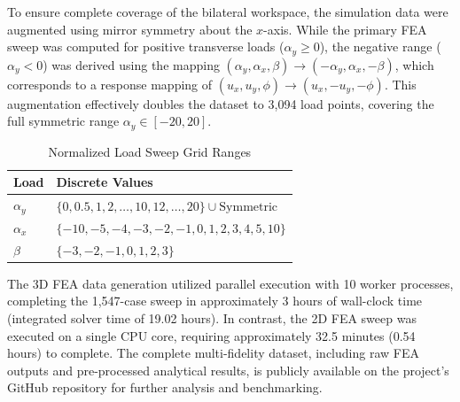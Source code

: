 \documentclass[colorlinks,upint,subscriptcorrection,varvw,hyphenate,balance]{asmeconf} %
\begin{document}
To ensure complete coverage of the bilateral workspace, the simulation data were augmented using mirror symmetry about the $x$-axis. While the primary FEA sweep was computed for positive transverse loads ($\alpha_y \geq 0$), the negative range ($\alpha_y < 0$) was derived using the mapping $(\alpha_y, \alpha_x, \beta) \to (-\alpha_y, \alpha_x, -\beta)$, which corresponds to a response mapping of $(u_x, u_y, \phi) \to (u_x, -u_y, -\phi)$. This augmentation effectively doubles the dataset to 3,094 load points, covering the full symmetric range $\alpha_y \in [-20, 20]$.

\begin{table}[ht]
\centering
\caption{Normalized Load Sweep Grid Ranges}
\label{tab:load_sweep}
\begin{tabular}{ll}
\toprule
\textbf{Load } & \textbf{Discrete Values} \\
\midrule
$\alpha_y$ & $\{0, 0.5, 1, 2, \dots, 10, 12, \dots, 20\} \cup \text{Symmetric}$ \\
$\alpha_x$ & $\{-10, -5, -4, -3, -2, -1, 0, 1, 2, 3, 4, 5, 10\}$ \\
$\beta$ & $\{-3, -2, -1, 0, 1, 2, 3\}$ \\
\bottomrule
\end{tabular}
\end{table}

The 3D FEA data generation utilized parallel execution with 10 worker processes, completing the 1,547-case sweep in approximately 3 hours of wall-clock time (integrated solver time of 19.02 hours). In contrast, the 2D FEA sweep was executed on a single CPU core, requiring approximately 32.5 minutes (0.54 hours) to complete. The complete multi-fidelity dataset, including raw FEA outputs and pre-processed analytical results, is publicly available on the project's GitHub repository for further analysis and benchmarking.
\end{document}

